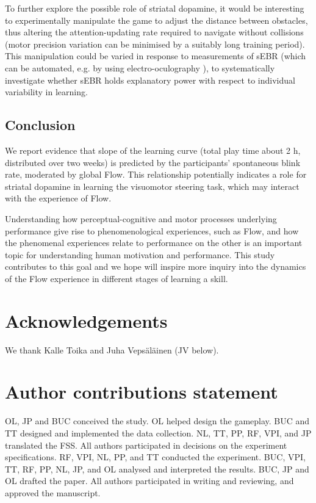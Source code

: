 \documentclass[10pt,letterpaper,floatsintext]{article}
\begin{document}
To further explore the possible role of striatal dopamine, it would be interesting to experimentally manipulate the game to adjust the distance between obstacles, thus altering the attention-updating rate required to navigate without collisions (motor precision variation can be minimised by a suitably long training period). This manipulation could be varied in response to measurements of sEBR (which can be automated, e.g. by using electro-oculography \cite{toivanen2014}), to systematically investigate whether sEBR holds explanatory power with respect to individual variability in learning.


\subsection{Conclusion}

We report evidence that slope of the learning curve (total play time about 2 h, distributed over two weeks) is predicted by the participants' spontaneous blink rate, moderated by global Flow. This relationship potentially indicates a role for striatal dopamine in learning the visuomotor steering task, which may interact with the experience of Flow.

Understanding how perceptual-cognitive and motor processes underlying performance give rise to phenomenological experiences, such as Flow, and how the phenomenal experiences relate to performance on the other is an important topic for understanding human motivation and performance. This study contributes to this goal and we hope will inspire more inquiry into the dynamics of the Flow experience in different stages of learning a skill.




\section{Acknowledgements}
We thank Kalle Toika and Juha Veps\"{a}l\"{a}inen (JV below).

\section*{Author contributions statement}
OL, JP and BUC conceived the study.
OL helped design the gameplay.
BUC and TT designed and implemented the data collection.
NL, TT, PP, RF, VPI, and JP translated the FSS.
All authors participated in decisions on the experiment specifications.
RF, VPI, NL, PP, and TT conducted the experiment.
BUC, VPI, TT, RF, PP, NL, JP, and OL analysed and interpreted the results.
BUC, JP and OL drafted the paper.
All authors participated in writing and reviewing, and approved the manuscript.




\setlength{\bibleftmargin}{.125in}
\setlength{\bibindent}{-\bibleftmargin}


\end{document}
